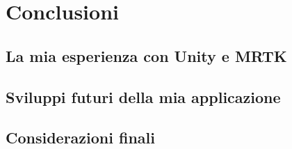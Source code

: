 \chapter{Conclusioni}
\pagestyle{plain}

\section{La mia esperienza con Unity e MRTK}

\section{Sviluppi futuri della mia applicazione}

\section{Considerazioni finali}